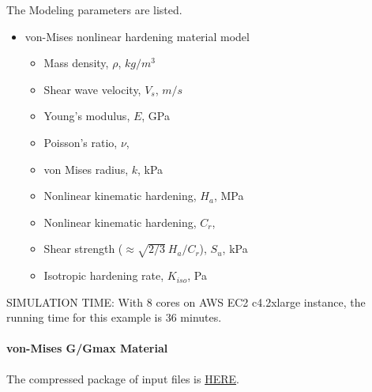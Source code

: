The Modeling parameters are listed.
\begin{itemize}
  \item von-Mises nonlinear hardening material model 
  \begin{itemize}
    \item Mass density, $\rho$, \enspace {} $kg/m^3$
    \item Shear wave velocity, $V_s$, \enspace {} $m/s$
    \item Young's modulus, $E$, \enspace {} GPa
    \item Poisson's ratio, $\nu$, \enspace {}
    \item von Mises radius, $k$, \enspace {} kPa
    \item Nonlinear kinematic hardening, $H_a$, \enspace {} MPa
    \item Nonlinear kinematic hardening, $C_r$, \enspace {}
    \item Shear strength ($\approx \sqrt{2/3}\ {H_a/C_r} $), $S_u$, \enspace {} kPa
    \item Isotropic hardening rate, $K_{iso}$, \enspace {} Pa
  \end{itemize}
\end{itemize}


SIMULATION TIME: With 8 cores on AWS EC2 c4.2xlarge instance, the running time for this example is 36 minutes.


\paragraph{von-Mises G/Gmax Material}
The compressed package of input files is  
\href{http://sokocalo.engr.ucdavis.edu/~jeremic/Real_ESSI_Simulator/Real_ESSI_Short_Course_Examples_Dec2017/short-course-examples/nonlinear_analysis_steps/soil-foundation/vonMisesGoverGmax/_all_files_packaged_for_vonMisesGoverGmax.tar.gz}{HERE}. 

